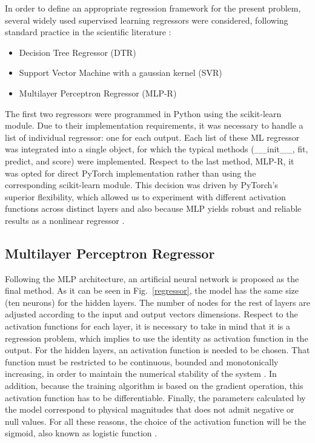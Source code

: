 \documentclass[review]{elsarticle}
\begin{document}
In order to define an appropriate regression framework for the present problem, several widely used supervised learning regressors were considered, following standard practice in the scientific literature \cite{witten2011data}:
\begin{itemize}
    \item Decision Tree Regressor (DTR)
    \item Support Vector Machine with a gaussian kernel (SVR)
    \item Multilayer Perceptron Regressor (MLP-R)
\end{itemize}

The first two regressors were programmed in Python using the scikit-learn 
module. Due to their implementation requirements, it was necessary to handle 
a list of individual regressor: one for each output. Each list of these ML 
regressor was integrated into a single object, for which the typical methods 
(\_\_init\_\_, fit, predict, and score) were implemented. Respect to the last 
method, MLP-R, it was opted for direct PyTorch implementation rather than using 
the corresponding scikit-learn module. This decision was driven by PyTorch's 
superior flexibility, which allowed us to experiment with different activation 
functions across distinct layers \cite{rpn20} and also because MLP yields 
robust and reliable results as a nonlinear regressor \cite{goodfellow2016deep}. 
 
 

\subsection{Multilayer Perceptron Regressor}

Following the MLP architecture, an artificial neural network is proposed as the final method. As it can be seen in Fig.~\ref{regressor}, the model has the same size (ten neurons) for the hidden layers. The number of nodes for the rest of layers are adjusted according to the input and output vectors dimensions. Respect to the activation functions for each layer, it is necessary to take in mind that it is a regression problem, which implies to use the identity as activation function in the output. For the hidden layers, an activation function is needed to be chosen. That function must be restricted to be continuous, bounded and monotonically  increasing, in order to maintain the numerical stability of the system \cite{haykin1999neural}. In addition, because the training algorithm is based on the gradient operation, this activation function has to be differentiable. Finally, the parameters calculated by the model correspond to physical magnitudes that does not admit negative or null values. For all these reasons, the choice of the activation function will be the sigmoid, also known as logistic function \cite{bishop1995mlp}.
\end{document}
